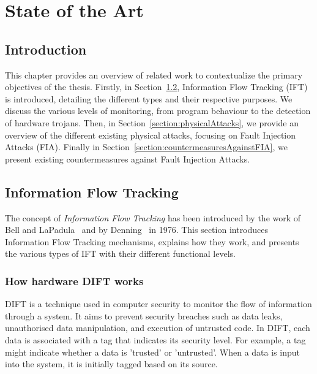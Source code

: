\chapter{State of the Art}
\label{chapter:soa}
\minitoc

\section{Introduction}
This chapter provides an overview of related work to contextualize the primary objectives of the thesis. Firstly, in Section~\ref{section:ift}, Information Flow Tracking (IFT) is introduced, detailing the different types and their respective purposes. We discuss the various levels of monitoring, from program behaviour to the detection of hardware trojans.
Then, in Section~\ref{section:physicalAttacks}, we provide an overview of the different existing physical attacks, focusing on Fault Injection Attacks (FIA).
Finally in Section~\ref{section:countermeasuresAgainstFIA}, we present existing countermeasures against Fault Injection Attacks.

\section{Information Flow Tracking}
\label{section:ift}
The concept of \textit{Information Flow Tracking} has been introduced by the work of Bell and LaPadula~\cite{BLP-76-military} and by Denning~\cite{D-76-commacm} in 1976.
This section introduces Information Flow Tracking mechanisms, explains how they work, and presents the various types of IFT with their different functional levels.

\subsection{How hardware DIFT works}
DIFT is a technique used in computer security to monitor the flow of information through a system. It aims to prevent security breaches such as data leaks, unauthorised data manipulation, and execution of untrusted code. In DIFT, each data is associated with a tag that indicates its security level.
For example, a tag might indicate whether a data is 'trusted' or 'untrusted'. When a data is input into the system, it is initially tagged based on its source.

